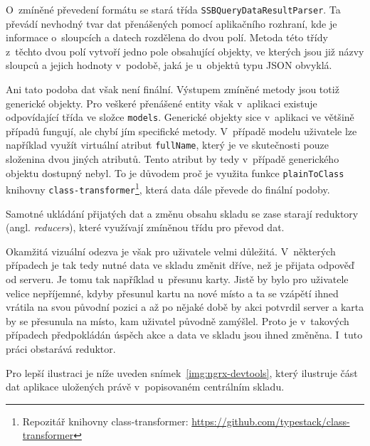 O~zmíněné převedení formátu se stará třída \texttt{SSBQueryDataResultParser}. Ta převádí nevhodný tvar dat přenášených pomocí aplikačního rozhraní, kde je informace o~sloupcích a datech rozdělena do dvou polí. Metoda této třídy z~těchto dvou polí vytvoří jedno pole obsahující objekty, ve kterých jsou již názvy sloupců a jejich hodnoty v~podobě, jaká je u~objektů typu JSON obvyklá.

Ani tato podoba dat však není finální. Výstupem zmíněné metody jsou totiž generické objekty. Pro veškeré přenášené entity však v~aplikaci existuje odpovídající třída ve složce \texttt{models}. Generické objekty sice v~aplikaci ve většině případů fungují, ale chybí jím specifické metody. V~případě modelu uživatele lze například využít virtuální atribut \texttt{fullName}, který je ve skutečnosti pouze složenina dvou jiných atributů. Tento atribut by tedy v~případě generického objektu dostupný nebyl. 
To je důvodem proč je využita funkce \texttt{plainToClass} knihovny \texttt{class-transformer}\footnote{Repozitář knihovny class-transformer: \url{https://github.com/typestack/class-transformer}}, která data dále převede do finální podoby.

Samotné ukládání přijatých dat a změnu obsahu skladu se zase starají reduktory (angl. \emph{reducers}), které využívají zmíněnou třídu pro převod dat. 

Okamžitá vizuální odezva je však pro uživatele velmi důležitá. V~některých případech je tak tedy nutné data ve skladu změnit dříve, než je přijata odpověď od serveru. Je tomu tak například u~přesunu karty. Jistě by bylo pro uživatele velice nepříjemné, kdyby přesunul kartu na nové místo a ta se vzápětí ihned vrátila na svou původní pozici a až po nějaké době by akci potvrdil server a karta by se přesunula na místo, kam uživatel původně zamýšlel. Proto je v~takových případech předpokládán úspěch akce a data ve skladu jsou ihned změněna. I~tuto práci obstarává reduktor.

Pro lepší ilustraci je níže uveden snímek~\ref{img:ngrx-devtools}, který ilustruje část dat aplikace uložených právě v~popisovaném centrálním skladu.

